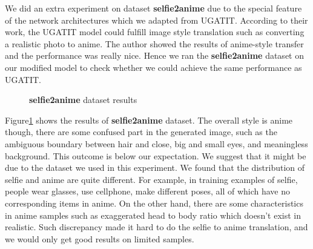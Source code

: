 \documentclass{article}
\begin{document}
We did an extra experiment on dataset \textbf{selfie2anime} due to the special feature of the network architectures which we adapted from UGATIT\cite{U-GAT-IT}. According to their work, the UGATIT model could fulfill image style translation such as converting a realistic photo to anime. The author showed the results of anime-style transfer and the performance was really nice. Hence we ran the \textbf{selfie2anime} dataset on our modified model to check whether we could achieve the same performance as UGATIT. 

\begin{figure}[H] 
    \centering
    \hspace*{.4in}
    \caption{\textbf{selfie2anime} dataset results}
    \label{fig:selfie2anime}
\end{figure}

Figure\ref{fig:selfie2anime} shows the results of \textbf{selfie2anime} dataset. The overall style is anime though, there are some confused part in the generated image, such as the ambiguous boundary between hair and close, big and small eyes, and meaningless background. This outcome is below our expectation. We suggest that it might be due to the dataset we used in this experiment. We found that the distribution of selfie and anime are quite different. For example, in training examples of selfie, people wear glasses, use cellphone, make different poses, all of which have no corresponding items in anime. On the other hand, there are some characteristics in anime samples such as exaggerated head to body ratio which doesn't exist in realistic. Such discrepancy made it hard to do the selfie to anime translation, and we would only get good results on limited samples.
\end{document}
